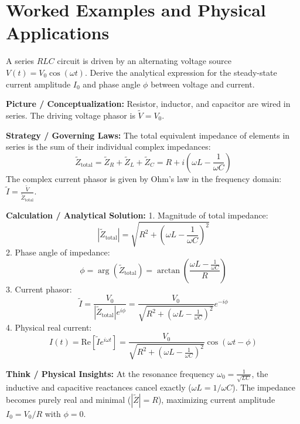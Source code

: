 \section{Worked Examples and Physical Applications}

\begin{psctexample}
A series $RLC$ circuit is driven by an alternating voltage source $V(t) = V_0 \cos(\omega t)$. Derive the analytical expression for the steady-state current amplitude $I_0$ and phase angle $\phi$ between voltage and current.

\textbf{\color{rbruNavy}Picture / Conceptualization:}
Resistor, inductor, and capacitor are wired in series. The driving voltage phasor is $\tilde{V} = V_0$.

\textbf{\color{rbruNavy}Strategy / Governing Laws:}
The total equivalent impedance of elements in series is the sum of their individual complex impedances:
\begin{equation}
\tilde{Z}_{\text{total}} = \tilde{Z}_R + \tilde{Z}_L + \tilde{Z}_C = R + i\left(\omega L - \frac{1}{\omega C}\right)
\end{equation}
The complex current phasor is given by Ohm's law in the frequency domain: $\tilde{I} = \frac{\tilde{V}}{\tilde{Z}_{\text{total}}}$.

\textbf{\color{rbruNavy}Calculation / Analytical Solution:}
1. Magnitude of total impedance:
\begin{equation}
|\tilde{Z}_{\text{total}}| = \sqrt{R^2 + \left(\omega L - \frac{1}{\omega C}\right)^2}
\end{equation}
2. Phase angle of impedance:
\begin{equation}
\phi = \arg(\tilde{Z}_{\text{total}}) = \arctan\left(\frac{\omega L - \frac{1}{\omega C}}{R}\right)
\end{equation}
3. Current phasor:
\begin{equation}
\tilde{I} = \frac{V_0}{|\tilde{Z}_{\text{total}}|e^{i\phi}} = \frac{V_0}{\sqrt{R^2 + \left(\omega L - \frac{1}{\omega C}\right)^2}}e^{-i\phi}
\end{equation}
4. Physical real current:
\begin{equation}
I(t) = \text{Re}[\tilde{I}e^{i\omega t}] = \frac{V_0}{\sqrt{R^2 + \left(\omega L - \frac{1}{\omega C}\right)^2}}\cos(\omega t - \phi)
\end{equation}

\textbf{\color{rbruNavy}Think / Physical Insights:}
At the resonance frequency $\omega_0 = \frac{1}{\sqrt{LC}}$, the inductive and capacitive reactances cancel exactly ($\omega L = 1/\omega C$). The impedance becomes purely real and minimal ($|\tilde{Z}| = R$), maximizing current amplitude $I_0 = V_0 / R$ with $\phi = 0$.
\qedexam
\end{psctexample}

